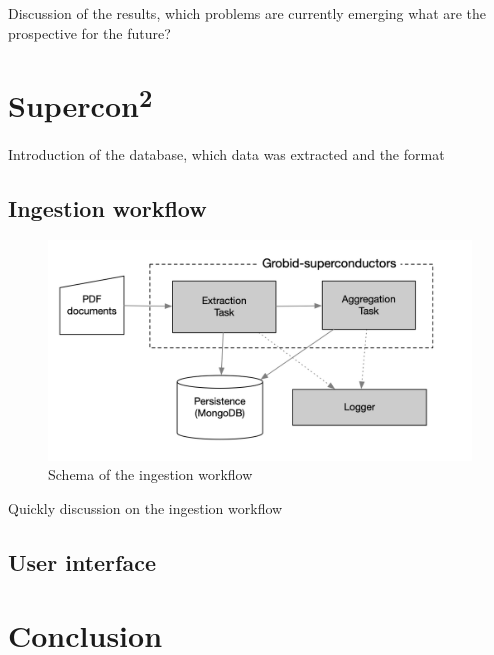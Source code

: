 \documentclass{article}
\begin{document}
Discussion of the results, which problems are currently emerging what are the prospective for the future?

\section{Supercon\textsuperscript{2}}

Introduction of the database, which data was extracted and the format 

\subsection{Ingestion workflow}
\label{subsec:ingestion-workflow}

\begin{figure}[ht]
\includegraphics[width=\textwidth]{workflow-schema-1}
\caption{Schema of the ingestion workflow}
\end{figure}


Quickly discussion on the ingestion workflow 


\subsection{User interface}
\label{sucsec:supercon2-user-interface}


\section{Conclusion}
\label{sec:conclusion}



\end{document}
